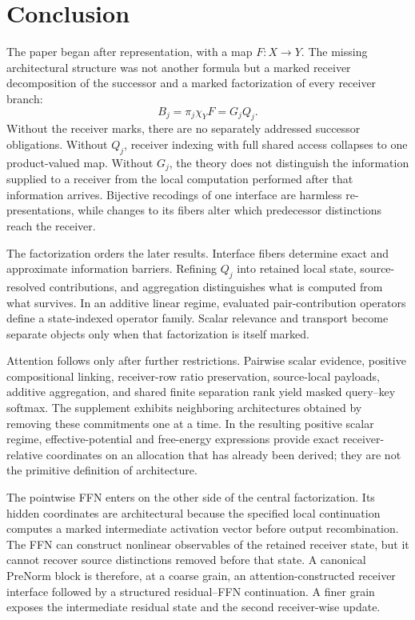 \section{Conclusion}\label{sec:conclusion}

The paper began after representation, with a map $F:X\to Y$. The missing architectural structure was not another formula but a marked receiver decomposition of the successor and a marked factorization of every receiver branch:
\[
\boxed{
B_j
=
\pi_j\chi_YF
=
G_jQ_j.
}
\]
Without the receiver marks, there are no separately addressed successor obligations. Without $Q_j$, receiver indexing with full shared access collapses to one product-valued map. Without $G_j$, the theory does not distinguish the information supplied to a receiver from the local computation performed after that information arrives. Bijective recodings of one interface are harmless re-presentations, while changes to its fibers alter which predecessor distinctions reach the receiver.

The factorization orders the later results. Interface fibers determine exact and approximate information barriers. Refining $Q_j$ into retained local state, source-resolved contributions, and aggregation distinguishes what is computed from what survives. In an additive linear regime, evaluated pair-contribution operators define a state-indexed operator family. Scalar relevance and transport become separate objects only when that factorization is itself marked.

Attention follows only after further restrictions. Pairwise scalar evidence, positive compositional linking, receiver-row ratio preservation, source-local payloads, additive aggregation, and shared finite separation rank yield masked query--key softmax. The supplement exhibits neighboring architectures obtained by removing these commitments one at a time. In the resulting positive scalar regime, effective-potential and free-energy expressions provide exact receiver-relative coordinates on an allocation that has already been derived; they are not the primitive definition of architecture.

The pointwise FFN enters on the other side of the central factorization. Its hidden coordinates are architectural because the specified local continuation computes a marked intermediate activation vector before output recombination. The FFN can construct nonlinear observables of the retained receiver state, but it cannot recover source distinctions removed before that state. A canonical PreNorm block is therefore, at a coarse grain, an attention-constructed receiver interface followed by a structured residual--FFN continuation. A finer grain exposes the intermediate residual state and the second receiver-wise update.

